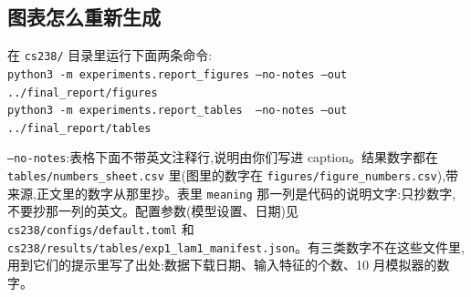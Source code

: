 \documentclass{article}
\newenvironment{pts}{\begin{itemize}[nosep,leftmargin=1.15em,topsep=1pt]}{\end{itemize}}
\begin{document}
\subsection*{图表怎么重新生成}
在 \texttt{cs238/} 目录里运行下面两条命令:\\
{\footnotesize\texttt{python3 -m experiments.report\_figures --no-notes --out ../final\_report/figures}\\
\texttt{python3 -m experiments.report\_tables\ \ --no-notes --out ../final\_report/tables}}\\[2pt]
{\raggedright \texttt{--no-notes}:表格下面不带英文注释行,说明由你们写进 caption。结果数字都在 \texttt{tables/numbers\_sheet.csv} 里(图里的数字在 \texttt{figures/figure\_numbers.csv}),带来源,正文里的数字从那里抄。表里 \texttt{meaning} 那一列是代码的说明文字:只抄数字,不要抄那一列的英文。配置参数(模型设置、日期)见 \texttt{cs238/configs/default.toml} 和 \texttt{cs238/results/tables/exp1\_lam1\_manifest.json}。有三类数字不在这些文件里,用到它们的提示里写了出处:数据下载日期、输入特征的个数、10 月模拟器的数字。\par}
\endgroup
\clearpage
\pagestyle{plain}
\setcounter{page}{1}
\fi

\maketitle
\suppressfloats[t]   %

\begin{abstract}
\begin{note}[摘要,约 150 词,全文写完以后再写]
五句话,一句只做一件事:
\begin{pts}
\item 问题:课本 6.6 节有两句话,你们对每一句各问一个问题。第一个问题课本自己提了;第二个是你们自己的问题,课本那句话没有覆盖这种情况。
\item 设定:每天交易前,agent 可以花钱买两个还没看到的预测。
\item 方法:贪心做法和精确解都算出来,在没有用来拟合 belief 的 2{,}984 天上比较。
\item 结果,数字从这里选:两种做法在 2{,}984 天里每天选的仓位都相同;$\lambda=1$ 时模型预测每天多得 $+0.84$ bp,实际是 $-2.70$ bp(95\% 区间 $[-4.6,\,-1.0]$);$\lambda=5$ 时区间包含 0,没有结论。
\item 结论:这两个结果合起来说明什么,你们自己判断。亏损的原因没有检验过,不写。
\end{pts}
\end{note}
\begin{model}
We ask whether a traffic signal that reacts to queue lengths leaves fewer cars waiting through a full cycle than a fixed timer does. In 30 simulated evenings per controller, 11.5\% of cars waited a full cycle under the reactive signal and 18.2\% under the timer; the spread across runs was about 2 points for each. We simulated a single intersection, so the result says nothing yet about a network.
\end{model}
\end{abstract}
\end{document}
